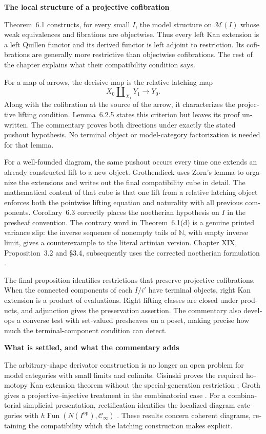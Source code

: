 \begin{otherlanguage}{english}
\medskip\noindent\textbf{The local structure of a projective cofibration}

Theorem~6.1 constructs, for every small $I$, the model structure on $\mathcal M(I)$ whose weak equivalences and fibrations are objectwise. Thus every left Kan extension is a left Quillen functor and its derived functor is left adjoint to restriction. Its cofibrations are generally more restrictive than objectwise cofibrations. The rest of the chapter explains what their compatibility condition says.

For a map of arrows, the decisive map is the relative latching map
\[
 X_0\amalg_{X_1}Y_1\longrightarrow Y_0.
\]
Along with the cofibration at the source of the arrow, it characterizes the projective lifting condition. Lemma~6.2.5 states this criterion but leaves its proof unwritten. The commentary proves both directions under exactly the stated pushout hypothesis. No terminal object or model-category factorization is needed for that lemma.

For a well-founded diagram, the same pushout occurs every time one extends an already constructed lift to a new object. Grothendieck uses Zorn's lemma to organize the extensions and writes out the final compatibility cube in detail. The mathematical content of that cube is that one lift from a relative latching object enforces both the pointwise lifting equation and naturality with all previous components. Corollary~6.3 correctly places the noetherian hypothesis on $I$ in the presheaf convention. The contrary word in Theorem~6.1(d) is a genuine printed variance slip: the inverse sequence of nonempty tails of $\mathbb N$, with empty inverse limit, gives a counterexample to the literal artinian version. Chapter XIX, Proposition~3.2 and \S3.4, subsequently uses the corrected noetherian formulation \citep{Grothendieck1990XIX}.

The final proposition identifies restrictions that preserve projective cofibrations. When the connected components of each $I/i'$ have terminal objects, right Kan extension is a product of evaluations. Right lifting classes are closed under products, and adjunction gives the preservation assertion. The commentary also develops a converse test with set-valued presheaves on a poset, making precise how much the terminal-component condition can detect.

\medskip\noindent\textbf{What is settled, and what the commentary adds}

The arbitrary-shape derivator construction is no longer an open problem for model categories with small limits and colimits. Cisinski proves the required homotopy Kan extension theorem without the special-generation restriction \citep[Theorem~6.11 and its dual]{Cisinski2003}; Groth gives a projective--injective treatment in the combinatorial case \citep[Proposition~1.30 and Theorem~1.32]{Groth2013}. For a combinatorial simplicial presentation, rectification identifies the localized diagram categories with $h\operatorname{Fun}(N(I^{\mathrm{op}}),\mathcal C_\infty)$ \citep[Proposition~4.2.4.4]{Lurie2009HTT}. These results concern coherent diagrams, retaining the compatibility which the latching construction makes explicit.


\end{otherlanguage}
